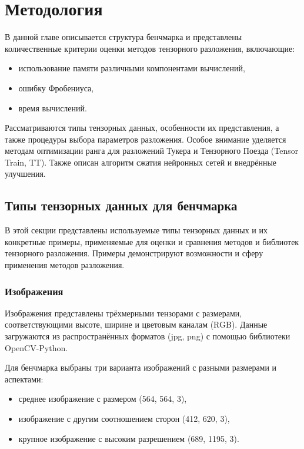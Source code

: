 \chapter{Методология}
\label{chap:methodology}

В данной главе описывается структура бенчмарка и представлены количественные критерии оценки методов тензорного разложения, включающие:
\begin{itemize}
    \item использование памяти различными компонентами вычислений,
    \item ошибку Фробениуса,
    \item время вычислений.
\end{itemize}
Рассматриваются типы тензорных данных, особенности их представления, а также процедуры выбора параметров разложения. Особое внимание уделяется методам оптимизации ранга для разложений Тукера и Тензорного Поезда (Tensor Train, TT). Также описан алгоритм сжатия нейронных сетей и внедрённые улучшения.

\section{Типы тензорных данных для бенчмарка}
\label{sec:tensor_data_types_for_benchmark}

В этой секции представлены используемые типы тензорных данных и их конкретные примеры, применяемые для оценки и сравнения методов и библиотек тензорного разложения. Примеры демонстрируют возможности и сферу применения методов разложения.

\subsection*{Изображения}

Изображения представлены трёхмерными тензорами с размерами, соответствующими высоте, ширине и цветовым каналам (RGB). Данные загружаются из распространённых форматов (jpg, png) с помощью библиотеки OpenCV-Python.

Для бенчмарка выбраны три варианта изображений с разными размерами и аспектами:
\begin{itemize}
    \item среднее изображение с размером (564, 564, 3),
    \item изображение с другим соотношением сторон (412, 620, 3),
    \item крупное изображение с высоким разрешением (689, 1195, 3).
\end{itemize}

